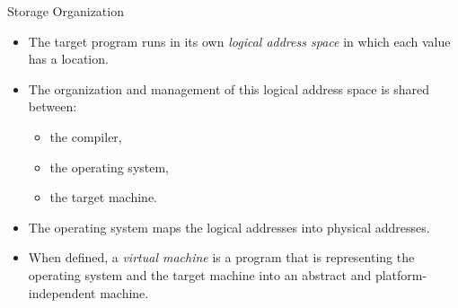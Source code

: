 \begin{bibunit}[apalike]
\begin{frame}{Storage Organization}
	\begin{itemize}
	\item The target program runs in its own \emph{logical address space} in which each value has a location.
	\item The organization and management of this logical address space is shared between: \begin{itemize}
		\item the compiler,
		\item the operating system,
		\item the target machine.
		\end{itemize}
	\vfill
	\item The operating system maps the logical addresses into physical addresses.
	\item When defined, a \emph{virtual machine} is a program that is representing the operating system and the target machine into an abstract and platform-independent machine.
	\end{itemize}
\end{frame}


\end{bibunit}
